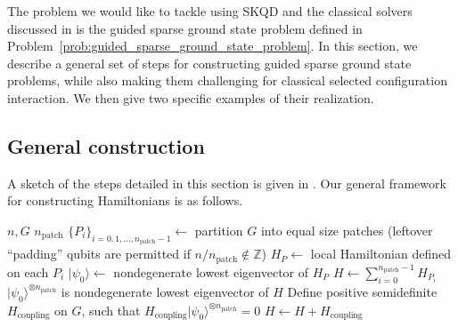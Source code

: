 \documentclass[
  reprint,            %
  amsmath,amssymb,
  aps,
  superscriptaddress, %
  longbibliography
]{revtex4-2}
\theoremstyle{definition}
\begin{document}
The problem we would like to tackle using SKQD and the classical solvers discussed in  is the guided sparse ground state problem defined in Problem~\ref{prob:guided_sparse_ground_state_problem}.
In this section, we describe a general set of steps for constructing guided sparse ground state problems, while also making them challenging for classical selected configuration interaction.
We then give two specific examples of their realization.


\subsection{General construction}
\label{sec:general_construction}

A sketch of the steps detailed in this section is given in .
Our general framework for constructing Hamiltonians is as follows.
\begin{algorithm}[H]
\caption{Hamiltonian construction schematic}\label{alg:gen_const}
\begin{algorithmic}[1]
    \Require $n, G$ 
    \Require $n_\mathrm{patch}$ 
    \State $\{P_i\}_{i=0,1,...,n_\mathrm{patch}-1} \gets$ partition $G$ into equal size patches (leftover ``padding'' qubits are permitted if $n/n_\mathrm{patch}\notin\mathbb{Z}$)
    \State $H_P \gets$ local Hamiltonian defined on each $P_i$
    \State $|\psi_0\rangle \gets$ nondegenerate lowest eigenvector of $H_P$
    \State $H \gets \sum_{i=0}^{n_\mathrm{patch}-1}H_{P_i}$ 
    \State $|\psi_0\rangle^{\otimes n_\mathrm{patch}}$ is nondegenerate lowest eigenvector of $H$
    \State Define positive semidefinite $H_\mathrm{coupling}$ on $G$, such that $H_\mathrm{coupling}|\psi_0\rangle^{\otimes n_\mathrm{patch}}=0$
    \State $H \gets H + H_\mathrm{coupling}$ 
\end{algorithmic}
\end{algorithm}
\end{document}
